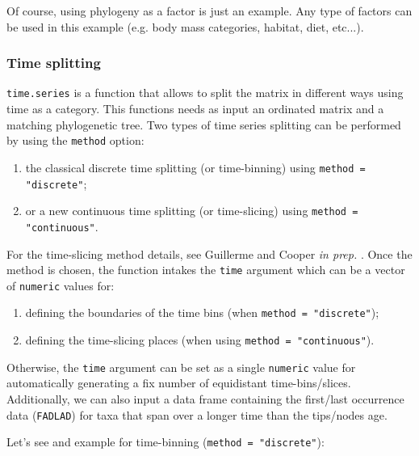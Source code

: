 \documentclass{article}\usepackage[]{graphicx}\usepackage[]{color}
\begin{document}
Of course, using phylogeny as a factor is just an example.
Any type of factors can be used in this example (e.g. body mass categories, habitat, diet, etc...).

\subsubsection{Time splitting}
\texttt{time.series} is a function that allows to split the matrix in different ways using time as a category.
This functions needs as input an ordinated matrix and a matching phylogenetic tree.
Two types of time series splitting can be performed by using the \texttt{method} option:
\begin{enumerate}
\item the classical discrete time splitting (or time-binning) using \texttt{method = "discrete"};
\item or a new continuous time splitting (or time-slicing) using \texttt{method = "continuous"}.
\end{enumerate}
For the time-slicing method details, see Guillerme and Cooper \textit{in prep.} \cite{GuillermeSTD}.
Once the method is chosen, the function intakes the \texttt{time} argument which can be a vector of \texttt{numeric} values for:
\begin{enumerate}
\item defining the boundaries of the time bins (when \texttt{method = "discrete"});
\item defining the time-slicing places (when using \texttt{method = "continuous"}).
\end{enumerate}
Otherwise, the \texttt{time} argument can be set as a single \texttt{numeric} value for automatically generating a fix number of equidistant time-bins/slices.
Additionally, we can also input a data frame containing the first/last occurrence data (\texttt{FADLAD}) for taxa that span over a longer time than the tips/nodes age.

Let's see and example for time-binning (\texttt{method = "discrete"}):
\end{document}

